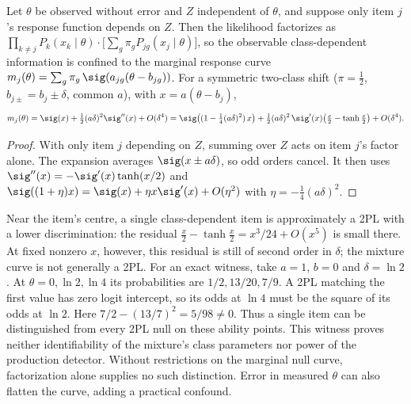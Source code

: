 \begin{proposition}\label{prop:single}\proved{}
Let $\theta$ be observed without error and $Z$ independent of $\theta$, and suppose only item
$j$'s response function depends on $Z$. Then the likelihood factorizes as
$\prod_{k\neq j}P_k(x_k\mid\theta)\cdot\bigl[\sum_g\pi_gP_{jg}(x_j\mid\theta)\bigr]$, so the
observable class-dependent information is confined to the marginal response curve
$m_j(\theta)=\sum_g\pi_g\,\sig(a_{jg}(\theta-b_{jg}))$. For a symmetric two-class shift
($\pi=\tfrac12$, $b_{j\pm}=b_j\pm\delta$, common $a$), with $x=a(\theta-b_j)$,
\begin{equation}\label{eq:single-expansion}
  m_j(\theta)=\sig(x)+\tfrac12(a\delta)^2\sig''(x)+O(\delta^4)
  =\sig\bigl((1-\tfrac14(a\delta)^2)\,x\bigr)
   +\tfrac12(a\delta)^2\,\sig'(x)\bigl(\tfrac{x}{2}-\tanh\tfrac{x}{2}\bigr)+O(\delta^4).
\end{equation}
\end{proposition}
\begin{proof}
With only item $j$ depending on $Z$, summing over $Z$ acts on item $j$'s factor alone. The
expansion averages $\sig(x\pm a\delta)$, so odd orders cancel. It then uses
$\sig''(x)=-\sig'(x)\tanh(x/2)$ and $\sig((1+\eta)x)=\sig(x)+\eta x\sig'(x)+O(\eta^2)$ with
$\eta=-\tfrac14(a\delta)^2$.
\end{proof}

Near the item's centre, a single class-dependent item is approximately a 2PL with a lower
discrimination: the residual $\tfrac{x}{2}-\tanh\tfrac{x}{2}=x^3/24+O(x^5)$ is small there.
At fixed nonzero $x$, however, this residual is still of second order in $\delta$; the
mixture curve is not generally a 2PL. For an exact witness, take $a=1$, $b=0$ and
$\delta=\ln2$. At $\theta=0,\ln2,\ln4$ its probabilities are $1/2,13/20,7/9$.
A 2PL matching the first value has zero logit intercept, so its odds at $\ln4$ must be the
square of its odds at $\ln2$. Here $7/2-(13/7)^2=5/98\ne0$. Thus a single item can be
distinguished from every 2PL null on these ability points. This witness proves neither
identifiability of the mixture's class parameters nor power of the production detector.
Without restrictions on the marginal null curve, factorization alone supplies no such
distinction. Error in measured $\theta$ can also flatten the curve, adding a practical confound.

